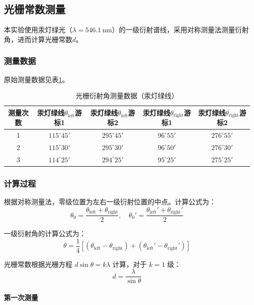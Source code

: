 \documentclass[11pt]{article}
\begin{document}
\subsection{光栅常数测量}

本实验使用汞灯绿光（\(\lambda = 546.1\ \text{nm}\)）的一级衍射谱线，采用对称测量法测量衍射角，进而计算光栅常数\(d\)。

\subsubsection{测量数据}

原始测量数据见表\ref{tab:grating_data}。

\begin{table}[htbp]
  \centering
  \caption{光栅衍射角测量数据（汞灯绿线）}
  \vspace{0.5em}
  \label{tab:grating_data}
  \begin{tabular}{ccccc}
    \toprule
    测量次数 & 汞灯绿线\(\theta_{\text{left}}\)游标1 & 汞灯绿线\(\theta_{\text{left}}\)游标2 & 汞灯绿线\(\theta_{\text{right}}\)游标1 & 汞灯绿线\(\theta_{\text{right}}\)游标2 \\
    \midrule
    1 & \(115^\circ45'\) & \(295^\circ45'\) & \(96^\circ55'\) & \(276^\circ55'\) \\
    2 & \(115^\circ30'\) & \(295^\circ30'\) & \(96^\circ50'\) & \(276^\circ30'\) \\
    3 & \(114^\circ25'\) & \(294^\circ25'\) & \(95^\circ25'\) & \(275^\circ25'\) \\
    \bottomrule
  \end{tabular}
\end{table}

\subsubsection{计算过程}

根据对称测量法，零级位置为左右一级衍射位置的中点。计算公式为：
\[
\theta_0 = \frac{\theta_{\text{left}} + \theta_{\text{right}}}{2}, \quad \theta_0' = \frac{\theta_{\text{left}}' + \theta_{\text{right}}'}{2}
\]

一级衍射角的计算公式为：
\[
\theta = \frac{1}{4}\left[(\theta_{\text{left}} - \theta_{\text{right}}) + (\theta_{\text{left}}' - \theta_{\text{right}}')\right]
\]

光栅常数根据光栅方程 \(d\sin\theta = k\lambda\) 计算，对于 \(k=1\) 级：
\[
d = \frac{\lambda}{\sin\theta}
\]

\paragraph{第一次测量}
\end{document}
